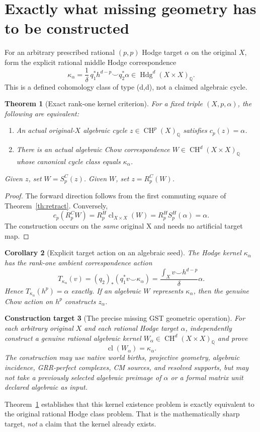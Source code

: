 \documentclass[11pt,a4paper]{article}
\newtheorem{theorem}{Theorem}[section]
\newtheorem{corollary}[theorem]{Corollary}
\newtheorem{problem}[theorem]{Construction target}
\newcommand{\Q}{\mathbb Q}
\newcommand{\CH}{\operatorname{CH}}
\newcommand{\Hdg}{\operatorname{Hdg}}
\newcommand{\cl}{\operatorname{cl}}
\begin{document}
\section{Exactly what missing geometry has to be constructed}
For an arbitrary prescribed rational \((p,p)\) Hodge target
\(\alpha\) on the original \(X\), form the explicit rational
middle Hodge correspondence
\[
 \boxed{\kappa_\alpha=
       \frac1\delta\,q_1^*h^{d-p}\smile q_2^*\alpha
       \in\Hdg^d(X\times X)_\Q.}\tag{4.1}
\]
This is a defined cohomology class of type (d,d), not
a claimed algebraic cycle.

\begin{theorem}[Exact rank-one kernel criterion]\label{th:equivalence}
For a fixed triple \((X,p,\alpha)\), the following are equivalent:
\begin{enumerate}
\item An actual original-\(X\) algebraic cycle \(z\in\CH^p(X)_\Q\)
      satisfies \(c_p(z)=\alpha\).
\item There is an actual algebraic Chow correspondence
      \(W\in\CH^d(X\times X)_\Q\) whose canonical cycle class
      equals \(\kappa_\alpha\).
\end{enumerate}
Given \(z\), set \(W=S^C_p(z)\).  Given \(W\), set \(z=R^C_p(W)\).
\end{theorem}
\begin{proof}
The forward direction follows from the first commuting
square of Theorem~\ref{th:retract}.  Conversely,
\[
 c_p(R^C_pW)=R^H_p\cl_{X\times X}(W)
            =R^H_p S^H_p(\alpha)=\alpha.
\]
The construction occurs on the \emph{same} original X
and needs no artificial target map.
\end{proof}

\begin{corollary}[Explicit target action on an algebraic seed]
The Hodge kernel \(\kappa_\alpha\) has the rank-one ambient
correspondence action
\[
 T_{\kappa_\alpha}(v)=
   (q_2)_*(q_1^*v\smile\kappa_\alpha)
   =\frac{\int_X v\smile h^{d-p}}{\delta}\alpha.
   \tag{4.2}
\]
Hence \(T_{\kappa_\alpha}(h^p)=\alpha\) exactly.
If an algebraic \(W\) represents \(\kappa_\alpha\), then the
genuine Chow action on \(h^p\) constructs \(z_\alpha\).
\end{corollary}

\begin{problem}[The precise missing GST geometric operation]
For each arbitrary original \(X\) and each rational Hodge
target \(\alpha\), independently construct a genuine rational
algebraic kernel \(W_\alpha\in\CH^d(X\times X)_\Q\) and prove
\[
             \cl(W_\alpha)=\kappa_\alpha. \tag{4.3}
\]
The construction may use native world births, projective
geometry, algebraic incidence, GRR-perfect complexes,
CM sources, and resolved supports, but may \emph{not}
take a previously selected algebraic preimage of \(\alpha\)
or a formal matrix unit declared algebraic as input.
\end{problem}
Theorem~\ref{th:equivalence} establishes that this
kernel existence problem is exactly equivalent to the
original rational Hodge class problem.  That is the
mathematically sharp target, \emph{not} a claim that
the kernel already exists.
\end{document}
